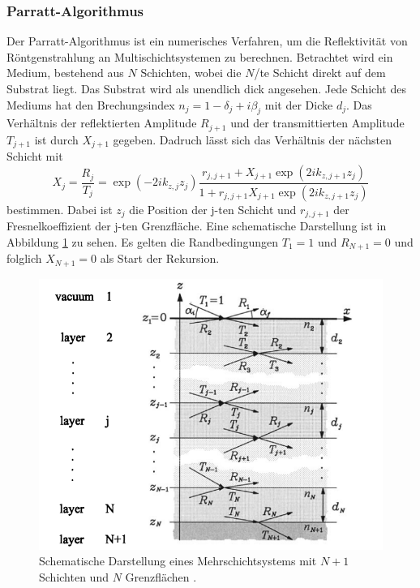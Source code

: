 \subsubsection{Parratt-Algorithmus} \label{sec:parratt}
Der Parratt-Algorithmus ist ein numerisches Verfahren, um die Reflektivität von Röntgenstrahlung an Multischichtsystemen zu berechnen.
Betrachtet wird ein Medium, bestehend aus $N$ Schichten, wobei die $N$/te Schicht direkt auf dem Substrat liegt.
Das Substrat wird als unendlich dick angesehen.
Jede Schicht des Mediums hat den Brechungsindex $n_j=1-\delta_j+i\beta_j$ mit der Dicke $d_j$.
Das Verhältnis der reflektierten Amplitude $R_{j+1}$ und der transmittierten Amplitude $T_{j+1}$ ist durch $X_{j+1}$ gegeben.
Dadruch lässt sich das Verhältnis der nächsten Schicht mit
\begin{equation}
    X_{j} = \frac{R_j}{T_j} = \exp{(-2i k_{z,j} z_j)} \frac{r_{j,j+1} + X_{j+1} \exp{(2i k_{z,j+1} z_j)}}{1+r_{j,j+1}X_{j+1} \exp{(2i k_{z,j+1} z_j)}}
\end{equation}
bestimmen. Dabei ist $z_j$ die Position der j-ten Schicht und $r_{j,j+1}$ der Fresnelkoeffizient der j-ten Grenzfläche.
Eine schematische Darstellung ist in Abbildung \ref{fig:parratt} zu sehen. 
Es gelten die Randbedingungen $T_1=1$ und $R_{N+1}=0$ und folglich $X_{N+1}=0$ als Start der Rekursion.
\begin{figure}[H]
    \centering
    \includegraphics[scale=0.5]{Bilder/parratt.png}
    \caption{Schematische Darstellung eines Mehrschichtsystems mit $N+1$ Schichten und $N$ Grenzflächen \cite{m-tolan2013}.}
    \label{fig:parratt}
\end{figure}
